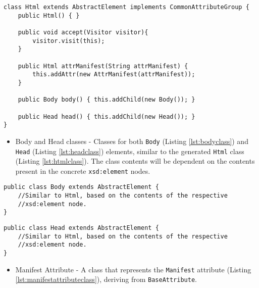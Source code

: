 
\begin{lstlisting}[caption={Html Element Class},captionpos=b,label={lst:htmlclass}]
class Html extends AbstractElement implements CommonAttributeGroup {
    public Html() { }
    
    public void accept(Visitor visitor){
		visitor.visit(this);    
    }
    
    public Html attrManifest(String attrManifest) {
        this.addAttr(new AttrManifest(attrManifest));
    }
    
    public Body body() { this.addChild(new Body()); }
        
    public Head head() { this.addChild(new Head()); }
}
\end{lstlisting}

\begin{itemize}
	\item Body and Head classes - Classes for both \texttt{Body} (Listing \ref{lst:bodyclass}) and \texttt{Head} (Listing \ref{lst:headclass}) elements, similar to the generated \texttt{Html} class (Listing \ref{lst:htmlclass}). The class contents will be dependent on the contents present in the concrete \texttt{xsd:element} nodes.
\end{itemize}

\bigskip

\begin{minipage}{\linewidth}
\begin{lstlisting}[caption={Body Element Class},captionpos=b,label={lst:bodyclass}]
public class Body extends AbstractElement {
    //Similar to Html, based on the contents of the respective
    //xsd:element node.
}
\end{lstlisting}
\end{minipage}

\bigskip

\begin{minipage}{\linewidth}
\begin{lstlisting}[caption={Head Element Class},captionpos=b,label={lst:headclass}]
public class Head extends AbstractElement {
    //Similar to Html, based on the contents of the respective 
    //xsd:element node.
}
\end{lstlisting}
\end{minipage}

\begin{itemize}
	\item Manifest Attribute - A class that represents the \texttt{Manifest} attribute  (Listing \ref{lst:manifestattributeclass}), deriving from \texttt{BaseAttribute}.
\end{itemize}

